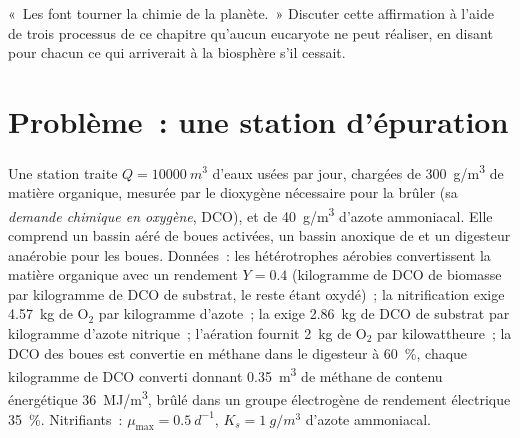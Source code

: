 \begin{exercise}[$\star\star\star$]\label{exo:b2:microbial-metabolism:12}
«~Les  font tourner la chimie de la planète.~» Discuter cette
affirmation à l'aide de trois processus de ce chapitre qu'aucun
eucaryote ne peut réaliser, en disant pour chacun ce qui arriverait à
la biosphère s'il cessait.
\end{exercise}

\section{Problème~: une station d'épuration}

\begin{problem}
\label{pb:b2:microbial-metabolism:1}
Une station traite $Q = \qty{10000}{m^3}$ d'eaux usées par jour,
chargées de \qty{300}{g/m^3} de matière organique, mesurée par le
dioxygène nécessaire pour la brûler (sa \emph{demande chimique en
oxygène}, DCO), et de \qty{40}{g/m^3} d'azote ammoniacal. Elle comprend
un bassin aéré de boues activées, un bassin anoxique de 
et un digesteur anaérobie pour les boues. Données~: les hétérotrophes
aérobies convertissent la matière organique avec un rendement $Y = 0.4$
(kilogramme de DCO de biomasse par kilogramme de DCO de substrat, le
reste étant oxydé)~; la nitrification exige \qty{4.57}{kg} de
$\mathrm{O_2}$ par kilogramme d'azote~; la  exige
\qty{2.86}{kg} de DCO de substrat par kilogramme d'azote nitrique~;
l'aération fournit \qty{2}{kg} de
$\mathrm{O_2}$ par kilowattheure~; la DCO des boues est convertie en
méthane dans le digesteur à \qty{60}{\%}, chaque kilogramme de DCO
converti donnant \qty{0.35}{m^3} de méthane de contenu énergétique
\qty{36}{MJ/m^3}, brûlé dans un groupe électrogène de rendement
électrique \qty{35}{\%}. Nitrifiants~: $\mu_{\max} = \qty{0.5}{d^{-1}}$, $K_s =
\qty{1}{g/m^3}$ d'azote ammoniacal.


\end{problem}
